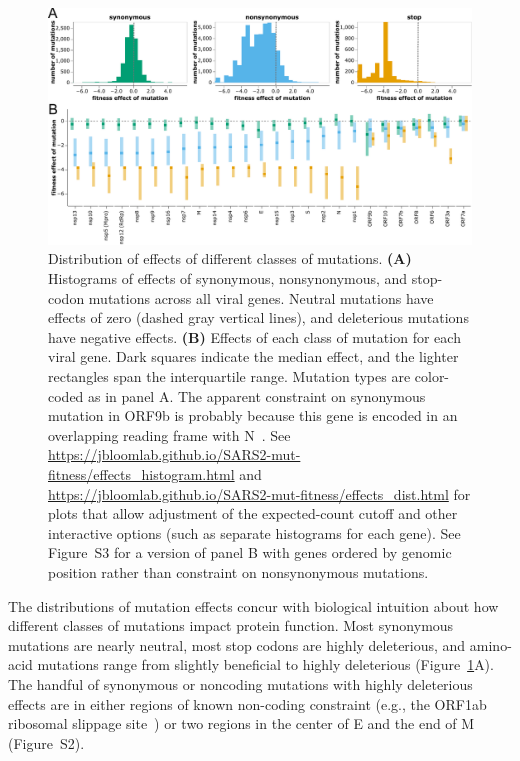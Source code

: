 \documentclass[9pt,twocolumn,twoside]{gsajnl_modified}
\begin{document}
\begin{figure}
\includegraphics[width=\linewidth]{figs/dist.pdf}
\caption{
Distribution of effects of different classes of mutations.
{\bf (A)}
Histograms of effects of synonymous, nonsynonymous, and stop-codon mutations across all viral genes.
Neutral mutations have effects of zero (dashed gray vertical lines), and deleterious mutations have negative effects.
{\bf (B)}
Effects of each class of mutation for each viral gene.
Dark squares indicate the median effect, and the lighter rectangles span the interquartile range.
Mutation types are color-coded as in panel A.
The apparent constraint on synonymous mutation in ORF9b is probably because this gene is encoded in an overlapping reading frame with N~\cite{jungreis2021conflicting}.
See \url{https://jbloomlab.github.io/SARS2-mut-fitness/effects_histogram.html} and \url{https://jbloomlab.github.io/SARS2-mut-fitness/effects_dist.html} for plots that allow adjustment of the expected-count cutoff and other interactive options (such as separate histograms for each gene).
See Figure~S3 for a version of panel B with genes ordered by genomic position rather than constraint on nonsynonymous mutations.
\label{fig:dist}
}
\end{figure}

The distributions of mutation effects concur with biological intuition about how different classes of mutations impact protein function.
Most synonymous mutations are nearly neutral, most stop codons are highly deleterious, and amino-acid mutations range from slightly beneficial to highly deleterious (Figure~\ref{fig:dist}A).
The handful of synonymous or noncoding mutations with highly deleterious effects are in either regions of known non-coding constraint (e.g., the ORF1ab ribosomal slippage site~\cite{bhatt2021structural}) or two regions in the center of E and the end of M (Figure~S2).
\end{document}
